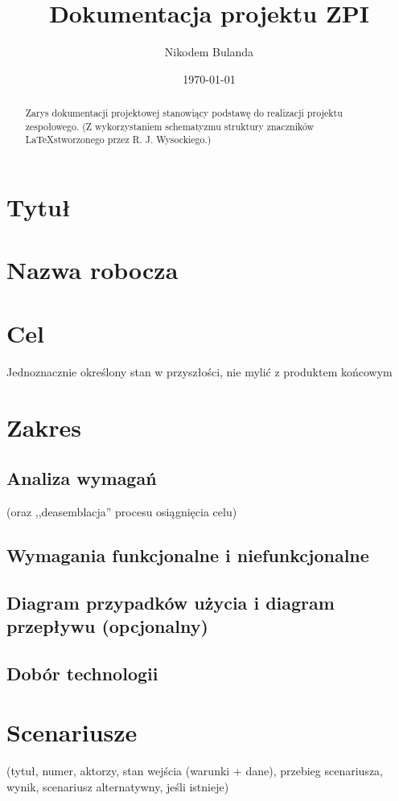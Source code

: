 \documentclass[12pt,a4paper]{article}
\begin{document}
\title{Dokumentacja projektu ZPI}
\author{Nikodem Bulanda}
\date{\today}

\maketitle

\begin{abstract}
Zarys dokumentacji projektowej stanowiący podstawę do realizacji projektu zespołowego. (Z wykorzystaniem schematyzmu struktury znaczników \LaTeX  stworzonego przez R. J. Wysockiego.) 
\end{abstract}

\newpage

\tableofcontents
\listoftables
\listoffigures

\newpage

\section{Tytuł}
\section{Nazwa robocza}
\section{Cel}
Jednoznacznie określony stan w przyszłości, nie mylić z produktem końcowym
\section{Zakres}
\subsection{Analiza wymagań}
 (oraz ,,deasemblacja'' procesu osiągnięcia celu)
\subsection{Wymagania funkcjonalne i niefunkcjonalne}
\subsection{Diagram przypadków użycia i diagram przepływu (opcjonalny)}
\subsection{Dobór technologii}
\section{Scenariusze}
(tytuł, numer, aktorzy, stan wejścia (warunki + dane), przebieg scenariusza, wynik, scenariusz alternatywny, jeśli istnieje)
\end{document}
